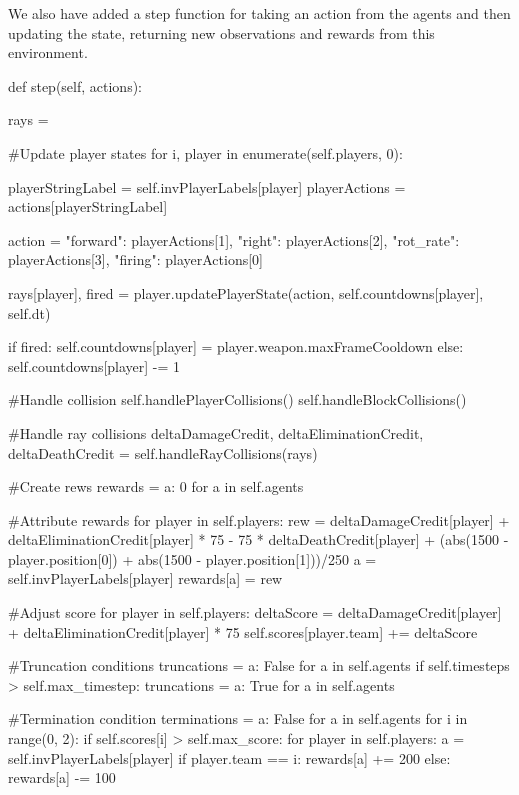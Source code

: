 We also have added a step function for taking an action from the agents and then updating the state, returning new observations and rewards from this environment.

\begin{mpy}
    def step(self, actions):

        rays = {}

        #Update player states
        for i, player in enumerate(self.players, 0):

            playerStringLabel = self.invPlayerLabels[player]
            playerActions = actions[playerStringLabel]

            action = {"forward": playerActions[1],
                    "right": playerActions[2],
                    "rot_rate": playerActions[3],
                    "firing": playerActions[0]}

            rays[player], fired = player.updatePlayerState(action, self.countdowns[player], self.dt)

            if fired:
                self.countdowns[player] = player.weapon.maxFrameCooldown
            else:
                self.countdowns[player] -= 1

        #Handle collision
        self.handlePlayerCollisions()
        self.handleBlockCollisions()
        
        #Handle ray collisions
        deltaDamageCredit, deltaEliminationCredit, deltaDeathCredit = self.handleRayCollisions(rays)        
        

        #Create rews
        rewards = {a: 0 for a in self.agents}

        #Attribute rewards
        for player in self.players:
            rew = deltaDamageCredit[player] + deltaEliminationCredit[player] * 75 - 75 * deltaDeathCredit[player] + (abs(1500 - player.position[0]) + abs(1500 - player.position[1]))/250
            a = self.invPlayerLabels[player]
            rewards[a] = rew

        #Adjust score
        for player in self.players:
            deltaScore = deltaDamageCredit[player] + deltaEliminationCredit[player] * 75
            self.scores[player.team] += deltaScore

        #Truncation conditions
        truncations = {a: False for a in self.agents}
        if self.timesteps > self.max_timestep:
            truncations = {a: True for a in self.agents}

        #Termination condition
        terminations = {a: False for a in self.agents}
        for i in range(0, 2):
            if self.scores[i] > self.max_score:
                for player in self.players:
                    a = self.invPlayerLabels[player]
                    if player.team == i:
                        rewards[a] += 200
                    else:
                        rewards[a] -= 100


\end{mpy}
